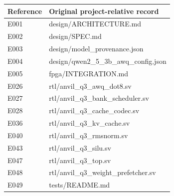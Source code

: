 \documentclass[11pt,a4paper]{article}
\begin{document}
{\small\renewcommand{\arraystretch}{1.18}\begin{longtable}{@{}L{0.12\textwidth}|L{0.82\textwidth}@{}}\toprule

\textbf{Reference} & \textbf{Original project-relative record}\\\midrule\endhead

E001 & design/\allowbreak{}ARCHITECTURE.md\\[2pt]\hline

E002 & design/\allowbreak{}SPEC.md\\[2pt]\hline

E003 & design/\allowbreak{}model\_\allowbreak{}provenance.json\\[2pt]\hline

E004 & design/\allowbreak{}qwen2\_\allowbreak{}5\_\allowbreak{}3b\_\allowbreak{}awq\_\allowbreak{}config.json\\[2pt]\hline

E005 & fpga/\allowbreak{}INTEGRATION.md\\[2pt]\hline

E026 & rtl/\allowbreak{}anvil\_\allowbreak{}q3\_\allowbreak{}awq\_\allowbreak{}dot8.sv\\[2pt]\hline

E027 & rtl/\allowbreak{}anvil\_\allowbreak{}q3\_\allowbreak{}bank\_\allowbreak{}scheduler.sv\\[2pt]\hline

E028 & rtl/\allowbreak{}anvil\_\allowbreak{}q3\_\allowbreak{}cache\_\allowbreak{}codec.sv\\[2pt]\hline

E036 & rtl/\allowbreak{}anvil\_\allowbreak{}q3\_\allowbreak{}kv\_\allowbreak{}cache.sv\\[2pt]\hline

E040 & rtl/\allowbreak{}anvil\_\allowbreak{}q3\_\allowbreak{}rmsnorm.sv\\[2pt]\hline

E043 & rtl/\allowbreak{}anvil\_\allowbreak{}q3\_\allowbreak{}silu.sv\\[2pt]\hline

E047 & rtl/\allowbreak{}anvil\_\allowbreak{}q3\_\allowbreak{}top.sv\\[2pt]\hline

E048 & rtl/\allowbreak{}anvil\_\allowbreak{}q3\_\allowbreak{}weight\_\allowbreak{}prefetcher.sv\\[2pt]\hline

E049 & tests/\allowbreak{}README.md\\[2pt]\hline


\end{longtable}}
\end{document}
